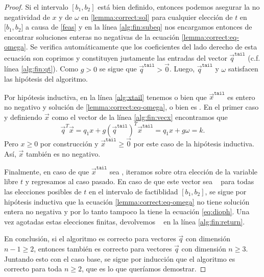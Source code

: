 \begin{proof}
	Si el intervalo $[b_1, b_2]$ está bien definido, entonces podemos asegurar la no negatividad de
	$x$ y de $\omega$ en \eqref{lemma:correct:sol} para cualquier elección de $t$ en $[b_1, b_2$] a
	causa de \eqref{feas} y en la línea \ref{alg:fin:subeq} nos encargamos entonces de encontrar
	soluciones enteras no negativas de la ecuación \eqref{lemma:correct:eq-omega}. Se verifica
	automáticamente que los coeficientes del lado derecho de esta ecuación son coprimos y
	constituyen justamente las entradas del vector $\vec{q}^{\texttt{tail}}$ (c.f. línea
	\ref{alg:fin:qt}). Como $g > 0$ se sigue que $\vec{q}^{\texttt{tail}} > \vec{0}$. Luego,
	$\vec{q}^{\texttt{tail}}$ y $\omega$ satisfacen las hipótesis del algoritmo.

	Por hipótesis inductiva, en la línea \ref{alg:xtail} tenemos o bien que
	$\vec{x}^{\texttt{tail}}$ es entero no negativo y solución de \eqref{lemma:correct:eq-omega}, o
	bien es \NIL. En el primer caso y definiendo $\vec{x}$ como el vector de la línea
	\ref{alg:fin:vecx} encontramos que
	\begin{equation*}
		\vec{q}^T\vec{x} = q_1x + g\left(\vec{q}^{\texttt{tail}}\right)^T\vec{x}^{\texttt{tail}}
		= q_1x + g\omega = k.
	\end{equation*}
	Pero $x \geq 0$ por construcción y $\vec{x}^{\texttt{tail}} \geq \vec{0}$ por este caso de la
	hipótesis inductiva. Así, $\vec{x}$ también es no negativo.

	Finalmente, en caso de que $\vec{x}^{\texttt{tail}}$ sea \NIL, iteramos sobre otra elección de
	la variable libre $t$ y regresamos al caso pasado. En caso de que este vector sea \NIL~ para
	todas las elecciones posibles de $t$ en el intervalo de factiblidad $[b_1, b_2]$, se sigue por
	hipótesis inductiva que la ecuación \eqref{lemma:correct:eq-omega} no tiene solución entera no
	negativa y por lo tanto tampoco la tiene la ecuación \eqref{eq:dioph}. Una vez agotadas estas
	elecciones finitas, devolvemos \NIL~ en la línea \ref{alg:fin:return}.

	En conclusión, si el algoritmo es correcto para vectores $\vec{q}$ con dimensión $n - 1 \geq 2$,
	entonces también es correcto para vectores $\vec{q}$ con dimensión $n \geq 3$. Juntando esto con el
	caso base, se sigue por inducción que el algoritmo es correcto para toda $n \geq 2$, que es lo
	que queríamos demostrar.
\end{proof}


